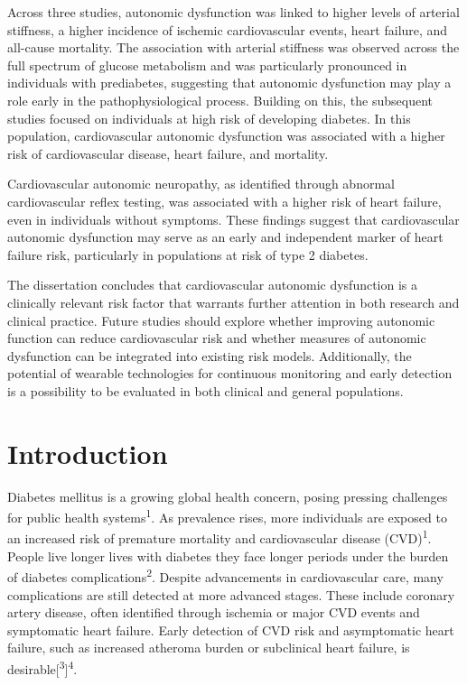\documentclass[
  a4paper,
  headsepline=true,
  open=any]{scrbook}
\begin{document}
Across three studies, autonomic dysfunction was linked to higher levels
of arterial stiffness, a higher incidence of ischemic cardiovascular
events, heart failure, and all-cause mortality. The association with
arterial stiffness was observed across the full spectrum of glucose
metabolism and was particularly pronounced in individuals with
prediabetes, suggesting that autonomic dysfunction may play a role early
in the pathophysiological process. Building on this, the subsequent
studies focused on individuals at high risk of developing diabetes. In
this population, cardiovascular autonomic dysfunction was associated
with a higher risk of cardiovascular disease, heart failure, and
mortality.

Cardiovascular autonomic neuropathy, as identified through abnormal
cardiovascular reflex testing, was associated with a higher risk of
heart failure, even in individuals without symptoms. These findings
suggest that cardiovascular autonomic dysfunction may serve as an early
and independent marker of heart failure risk, particularly in
populations at risk of type 2 diabetes.

The dissertation concludes that cardiovascular autonomic dysfunction is
a clinically relevant risk factor that warrants further attention in
both research and clinical practice. Future studies should explore
whether improving autonomic function can reduce cardiovascular risk and
whether measures of autonomic dysfunction can be integrated into
existing risk models. Additionally, the potential of wearable
technologies for continuous monitoring and early detection is a
possibility to be evaluated in both clinical and general populations.


\hypertarget{introduction}{%
\chapter{Introduction}\label{introduction}}

Diabetes mellitus is a growing global health concern, posing pressing
challenges for public health systems\textsuperscript{1}. As prevalence
rises, more individuals are exposed to an increased risk of premature
mortality and cardiovascular disease (CVD)\textsuperscript{1}. People
live longer lives with diabetes they face longer periods under the
burden of diabetes complications\textsuperscript{2}. Despite
advancements in cardiovascular care, many complications are still
detected at more advanced stages. These include coronary artery disease,
often identified through ischemia or major CVD events and symptomatic
heart failure. Early detection of CVD risk and asymptomatic heart
failure, such as increased atheroma burden or subclinical heart failure,
is desirable{[}\textsuperscript{3}{]}\textsuperscript{4}.
\end{document}
